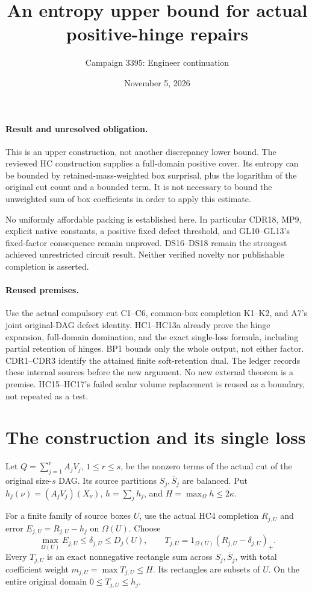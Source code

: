 \documentclass[11pt]{article}
\title{An entropy upper bound for actual positive-hinge repairs}
\author{Campaign 3395: Engineer continuation}
\date{November 5, 2026}
\newcommand{\Om}{\Omega}
\begin{document}
\maketitle

\paragraph{Result and unresolved obligation.}
This is an upper construction, not another discrepancy lower bound.
The reviewed HC construction supplies a full-domain positive cover.
Its entropy can be bounded by retained-mass-weighted box surprisal,
plus the logarithm of the original cut count and a bounded term.
It is not necessary to bound the unweighted sum of box coefficients
in order to apply this estimate.

No uniformly affordable packing is established here. In particular
CDR18, MP9, explicit native constants, a positive fixed defect
threshold, and GL10--GL13's fixed-factor consequence remain unproved.
DS16--DS18 remain the strongest achieved unrestricted circuit result.
Neither verified novelty nor publishable completion is asserted.

\paragraph{Reused premises.}
Use the actual compulsory cut C1--C6, common-box completion K1--K2,
and A7's joint original-DAG defect identity. HC1--HC13a already
prove the hinge expansion, full-domain domination, and the exact
single-loss formula, including partial retention of hinges.
BP1 bounds only the whole output, not either factor.
CDR1--CDR3 identify the attained finite soft-retention dual.
The ledger records these internal sources before the new argument.
No new external theorem is a premise. HC15--HC17's failed scalar
volume replacement is reused as a boundary, not repeated as a test.

\section{The construction and its single loss}
Let $Q=\sum_{j=1}^r A_jV_j$, $1\le r\le s$, be the nonzero
terms of the actual cut of the original size-$s$ DAG. Its source
partitions $S_j,\overline S_j$ are balanced. Put
$h_j(\nu)=(A_jV_j)(X_\nu)$, $h=\sum_jh_j$, and
$H=\max_{\Om}h\le2\kappa$.

For a finite family of source boxes $U$, use the actual HC4
completion $R_{j,U}$ and error $E_{j,U}=R_{j,U}-h_j$ on $\Om(U)$.
Choose
\[
 \max_{\Om(U)}E_{j,U}\le\delta_{j,U}\le D_j(U),\qquad
 T_{j,U}=1_{\Om(U)}(R_{j,U}-\delta_{j,U})_+ .       \tag{HE1}
\]
Every $T_{j,U}$ is an exact nonnegative rectangle sum across
$S_j,\overline S_j$, with total coefficient weight
$m_{j,U}=\max T_{j,U}\le H$. Its rectangles are subsets of $U$.
On the entire original domain $0\le T_{j,U}\le h_j$.
\end{document}
